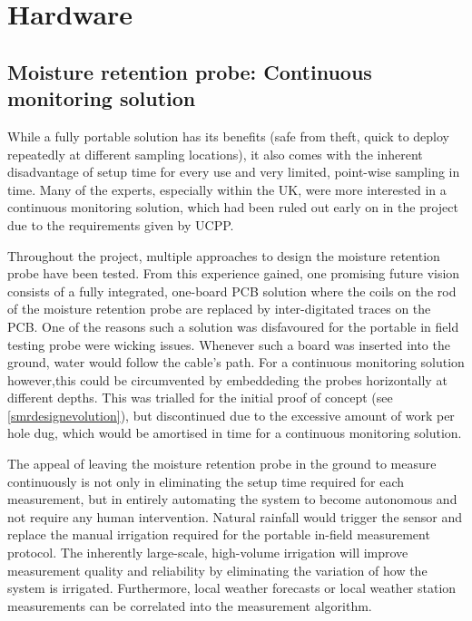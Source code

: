 \section{Hardware}

\subsection{Moisture retention probe: Continuous monitoring solution}%
\label{smrpcontinuousmonitoring}
While a fully portable solution has its benefits (safe from theft, quick to deploy repeatedly at different sampling locations), it also comes with the inherent disadvantage of setup time for every use and very limited, point-wise sampling in time. Many of the experts, especially within the UK, were more interested in a continuous monitoring solution, which had been ruled out early on in the project due to the requirements given by UCPP.

Throughout the project, multiple approaches to design the moisture retention probe have been tested. From this experience gained, one promising future vision consists of a fully integrated, one-board PCB solution where the coils on the rod of the moisture retention probe are replaced by inter-digitated traces on the PCB. One of the reasons such a solution was disfavoured for the portable in field testing probe were wicking issues. Whenever such a board was inserted into the ground, water would follow the cable's path. For a continuous monitoring solution however,this could be circumvented by embeddeding the probes horizontally at different depths. This was trialled for the initial proof of concept (see \cref{smrdesignevolution}), but discontinued due to the excessive amount of work per hole dug, which would be amortised in time for a continuous monitoring solution.

The appeal of leaving the moisture retention probe in the ground to measure continuously is not only in eliminating the setup time required for each measurement, but in entirely automating the system to become autonomous and not require any human intervention. Natural rainfall would trigger the sensor and replace the manual irrigation required for the portable in-field measurement protocol. The inherently large-scale, high-volume irrigation will improve measurement quality and reliability by eliminating the variation of how the system is irrigated. Furthermore, local weather forecasts or local weather station measurements can be correlated into the measurement algorithm.

